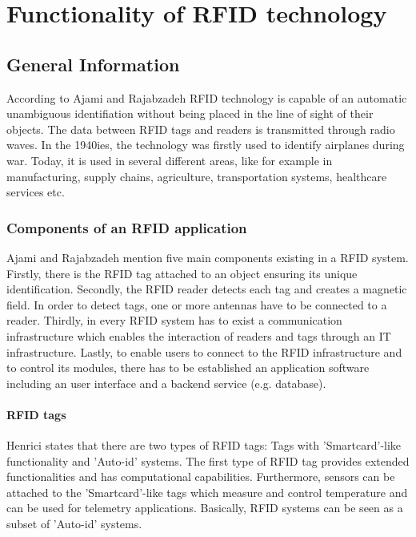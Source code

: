 \chapter{Functionality of RFID technology}
\label{Kap2}

\section{General Information}

According to Ajami and Rajabzadeh \cite{ncbi} RFID technology is capable of an automatic unambiguous identifiation without being placed in the line of sight of their objects. The data between RFID tags and readers is transmitted through radio waves. In the 1940ies, the technology was firstly used to identify airplanes during war. Today, it is used in several different areas, like for example in manufacturing, supply chains, agriculture, transportation systems, healthcare services etc. 

\subsection{Components of an RFID application}

Ajami and Rajabzadeh \cite{ncbi} mention five main components existing in a RFID system. Firstly, there is the RFID tag attached to an object ensuring its unique identification. Secondly, the RFID reader detects each tag and creates a magnetic field. In order to detect tags, one or more antennas have to be connected to a reader. Thirdly, in every RFID system has to exist a communication infrastructure which enables the interaction of readers and tags through an \ac{IT} infrastructure. Lastly, to enable users to connect to the RFID infrastructure and to control its modules, there has to be established an application software including an user interface and a backend service (e.g. database).

\subsubsection{RFID tags} \label{tags}

Henrici \cite{henrici} states that there are two types of RFID tags: Tags with 'Smartcard'-like functionality and 'Auto-id' systems. The first type of RFID tag provides extended functionalities and has computational capabilities. Furthermore, sensors can be attached to the 'Smartcard'-like tags which measure and control temperature and can be used for telemetry applications. Basically, RFID systems can be seen as a subset of 'Auto-id' systems.

